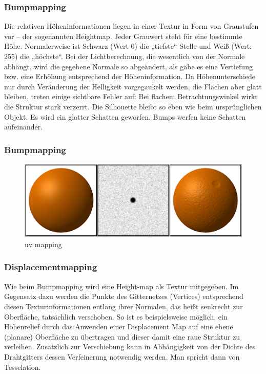 \subsubsection{Bumpmapping}
Die relativen Höheninformationen liegen in einer Textur in Form von Graustufen vor – der sogenannten Heightmap. Jeder Grauwert steht für eine bestimmte Höhe. Normalerweise ist Schwarz (Wert 0) die „tiefste“ Stelle und Weiß (Wert: 255) die „höchste“.  Bei der Lichtberechnung, die wesentlich von der Normale abhängt, wird die gegebene Normale so abgeändert, als gäbe es eine Vertiefung bzw. eine Erhöhung entsprechend der Höheninformation.  Da Höhenunterschiede nur durch Veränderung der Helligkeit vorgegaukelt werden, die Flächen aber glatt bleiben, treten einige sichtbare Fehler auf:
Bei flachem Betrachtungswinkel wirkt die Struktur stark verzerrt.
Die Silhouette bleibt so eben wie beim ursprünglichen Objekt.
Es wird ein glatter Schatten geworfen.
Bumps werfen keine Schatten aufeinander.
\subsubsection{Bumpmapping}
\begin{figure}[H]
    \centering
    \includegraphics[width=1.0\textwidth]{images/Bumpmap.png}
    \caption{uv mapping} %
    \label{fig:uv-mapping3}
\end{figure}




\subsubsection{Displacementmapping}
Wie beim Bumpmapping  wird  eine Height-map als Textur mitgegeben.
Im Gegensatz dazu werden die Punkte des Gitternetzes (Vertices)  entsprechend diesen Texturinformationen entlang ihrer Normalen, das heißt senkrecht zur Oberfläche, tatsächlich verschoben. So ist es beispielsweise möglich, ein Höhenrelief durch das Anwenden einer Displacement Map auf eine ebene (planare) Oberfläche zu übertragen und dieser damit eine raue Struktur zu verleihen. Zusätzlich zur Verschiebung kann in Abhängigkeit von der Dichte des Drahtgitters dessen Verfeinerung notwendig werden. Man spricht dann von Tesselation.

